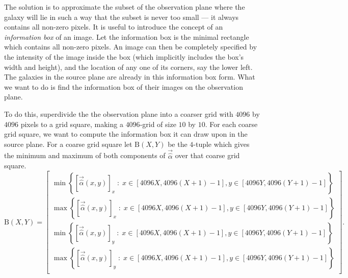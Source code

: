 \documentclass[10pt,twoside]{article}
\theoremstyle{definition}
\theoremstyle{exercise}
\newcommand{\setc}[2]{\left\{#1\; :\; #2 \right\}}%
\begin{document}
The solution is to approximate the subset of the observation plane where the galaxy will lie in such a way that the subset is never too small --- it always contains all non-zero pixels. It is useful to introduce the concept of an \textit{information box} of an image. Let the information box is the minimal rectangle which contains all non-zero pixels. An image can then be completely specified by the intensity of the image inside the box (which implicitly includes the box's width and height), and the location of any one of its corners, say the lower left. The galaxies in the source plane are already in this information box form. What we want to do is find the information box of their images on the observation plane.

To do this, superdivide the the observation plane into a coarser grid with $4096$ by $4096$ pixels to a grid square, making a $4096$-grid of size $10$ by $10$. For each coarse grid square, we want to compute the information box it can draw upon in the source plane. For a coarse grid square let $\text{B}(X,Y)$ be the $4$-tuple which gives the minimum and maximum of both components of $\vec{\hat{\alpha}}$ over that coarse grid square.
\begin{equation}
  \text{B}(X, Y) = \begin{bmatrix}
    \min\setc{\left[\vec{\hat{\alpha}}(x,y)\right]_x}{x \in [4096X, 4096(X+1)-1], y \in [4096Y, 4096(Y+1)-1]}\\[1em] 
    \max\setc{\left[\vec{\hat{\alpha}}(x,y)\right]_x}{x \in [4096X, 4096(X+1)-1], y \in [4096Y, 4096(Y+1)-1]}\\[1em]
    \min\setc{\left[\vec{\hat{\alpha}}(x,y)\right]_y}{x \in [4096X, 4096(X+1)-1], y \in [4096Y, 4096(Y+1)-1]}\\[1em] 
    \max\setc{\left[\vec{\hat{\alpha}}(x,y)\right]_y}{x \in [4096X, 4096(X+1)-1], y \in [4096Y, 4096(Y+1)-1]}\\[1em] 
    \end{bmatrix}.
  \label{eq:grid_alpha_box}
\end{equation}
\end{document}
